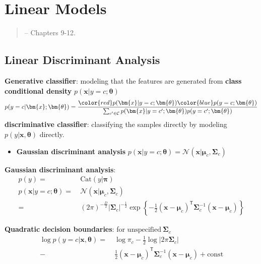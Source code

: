 \section{Linear Models}

\begin{quote}
    \citep{pml1Book} -- Chapters 9-12.
\end{quote}

\subsection{Linear Discriminant Analysis}

\textbf{Generative classifier}: 
modeling that the features are generated from \textbf{class conditional density} $p(\bm{x}|y=c;\bm{\theta})$
\begin{gather}
    p(y=c|\bm{x};\bm{\theta})=
    \frac{{\color{red}p(\bm{x}|y=c;\bm{\theta})}{\color{blue}p(y=c;\bm{\theta})}}
    {\sum_{c'\in\mathcal{C}}p(\bm{x}|y=c';\bm{\theta})p(y=c';\bm{\theta})}\\
\end{gather}
\textbf{discriminative classifier}: classifying the samples directly by modeling $p(y|\bm{x},\bm{\theta})$ directly.
\begin{itemize}
    \item \textbf{Gaussian discriminant analysis} $p(\bm{x}|y=c;\bm{\theta})=\mathcal{N}(\bm{x}|\bm{\mu}_c,\bm{\Sigma}_c)$
\end{itemize}

\textbf{Gaussian discriminant analysis}: 
\begin{align}
    p(y) =&~ \mathrm{Cat}(y|\bm{\pi})\\
    p(\bm{x}|y=c;\bm{\theta})
    =&~ \mathcal{N}(\bm{x}|\bm{\mu}_c,\bm{\Sigma}_c)\\
    =&~ (2\pi)^{-\frac{D}{2}}|\bm{\Sigma}_c|^{-\frac{1}{2}}\exp\left\{
        -\frac{1}{2}(\bm{x}-\bm{\mu}_c)^\mathsf{T}\bm{\Sigma}_c^{-1}(\bm{x}-\bm{\mu}_c)
    \right\}
\end{align}

\textbf{Quadratic decision boundaries}: 
for $\text{unspecified}~\bm{\Sigma}_c$
\begin{align}
    \log{p(y=c|\bm{x},\bm{\theta})}
    =&~ \log{\pi_c}-\frac{1}{2}\log|2\pi\bm{\Sigma}_c| \\
      -&~ \boxed{\frac{1}{2}(\bm{x}-\bm{\mu}_c)^\mathsf{T}\bm{\Sigma}_c^{-1}(\bm{x}-\bm{\mu}_c)}
      + \text{const}
\end{align}

